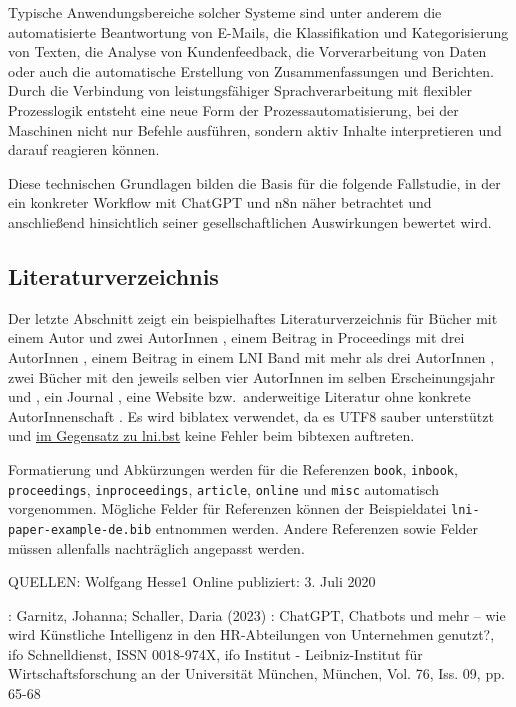 \documentclass[utf8,biblatex]{bremerhaven_lni}
\begin{document}
Typische Anwendungsbereiche solcher Systeme sind unter anderem die automatisierte Beantwortung von E-Mails, die Klassifikation und Kategorisierung von Texten, die Analyse von Kundenfeedback, die Vorverarbeitung von Daten oder auch die automatische Erstellung von Zusammenfassungen und Berichten. Durch die Verbindung von leistungsfähiger Sprachverarbeitung mit flexibler Prozesslogik entsteht eine neue Form der Prozessautomatisierung, bei der Maschinen nicht nur Befehle ausführen, sondern aktiv Inhalte interpretieren und darauf reagieren können.

Diese technischen Grundlagen bilden die Basis für die folgende Fallstudie, in der ein konkreter Workflow mit ChatGPT und n8n näher betrachtet und anschließend hinsichtlich seiner gesellschaftlichen Auswirkungen bewertet wird.

\subsection{Literaturverzeichnis}
Der letzte Abschnitt zeigt ein beispielhaftes Literaturverzeichnis für Bücher mit einem Autor \cite{Ez10} und zwei AutorInnen \cite{AB00}, einem Beitrag in Proceedings mit drei AutorInnen \cite{ABC01}, einem Beitrag in einem LNI Band mit mehr als drei AutorInnen \cite{Az09}, zwei Bücher mit den jeweils selben vier AutorInnen im selben Erscheinungsjahr \cite{Wa14} und \cite{Wa14b}, ein Journal \cite{Gl06}, eine Website \cite{GI19} bzw.\ anderweitige Literatur ohne konkrete AutorInnenschaft \cite{XX14}.
Es wird biblatex verwendet, da es UTF8 sauber unterstützt und \href{https://github.com/gi-ev/LNI/issues/5}{im Gegensatz zu lni.bst} keine Fehler beim bibtexen auftreten.

Formatierung und Abkürzungen werden für die Referenzen \texttt{book}, \texttt{inbook}, \texttt{proceedings}, \texttt{inproceedings}, \texttt{article}, \texttt{online} und \texttt{misc} automatisch vorgenommen.
Mögliche Felder für Referenzen können der Beispieldatei \texttt{lni-paper-example-de.bib} entnommen werden.
Andere Referenzen sowie Felder müssen allenfalls nachträglich angepasst werden.

QUELLEN:
Wolfgang Hesse1
Online publiziert: 3. Juli 2020


: Garnitz, Johanna; Schaller, Daria (2023) : ChatGPT, Chatbots und mehr – wie
wird Künstliche Intelligenz in den HR-Abteilungen von Unternehmen genutzt?, ifo Schnelldienst,
ISSN 0018-974X, ifo Institut - Leibniz-Institut für Wirtschaftsforschung an der Universität München,
München, Vol. 76, Iss. 09, pp. 65-68
\end{document}
